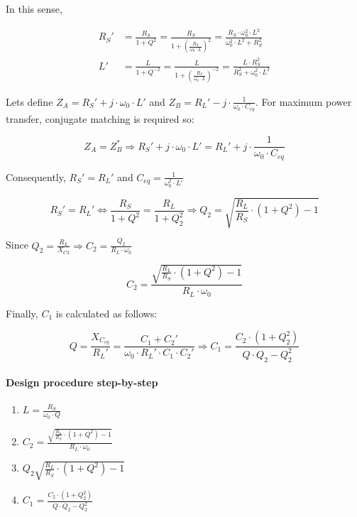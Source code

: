 \noindent In this sense,

\begin{align}
  R_S' &= \frac{R_S}{1 + Q^2} = \frac{R_S}{1 + \left( \frac{R_S}{\omega_0 \cdot L} \right)^2} = \frac{R_S \cdot \omega_0^2 \cdot L^2}{\omega_0^2 \cdot L^2 + R_S^2}\\
  L' &= \frac{L}{1 + Q^{-2}} = \frac{L}{1 + \left( \frac{R_S}{\omega_0 \cdot L}\right)^{-2}} = \frac{L \cdot R_S^2}{R_S^2 + \omega_0^2 \cdot L^2}
\end{align}

\noindent Lets define $Z_A = R_S' + j \cdot \omega_0 \cdot L'$ and $Z_B = R_L' - j \cdot \frac{1}{\omega_0 \cdot C_{eq}}$. For maximum power transfer, conjugate matching is required so:

\begin{equation}
Z_A = Z_B^* \Longrightarrow R_S' + j \cdot \omega_0 \cdot L' = R_L' + j \cdot \frac{1}{\omega_0 \cdot C_{eq}}
\end{equation}

\noindent Consequently, $R_S' = R_L'$ and $C_{eq} = \frac{1}{\omega_0^2 \cdot L'}$

\begin{equation}
R_S' = R_L' \Longleftrightarrow \frac{R_S}{1 + Q^2} = \frac{R_L}{1 + Q_2^2} \Longrightarrow Q_2 = \sqrt{\frac{R_L}{R_S} \cdot (1 + Q^2) - 1}
\end{equation}


\noindent Since $Q_2 = \frac{R_L}{X_{C2}} \Longrightarrow C_2 = \frac{Q_2}{R_L \cdot \omega_0}$

\begin{equation}
C_2 = \frac{\sqrt{\frac{R_L}{R_S} \cdot (1 + Q^2)  - 1 }}{R_L \cdot \omega_0}
\end{equation}

\noindent Finally, $C_1$ is calculated as follows:

\begin{equation}
Q = \frac{X_{C_{eq}}}{R_L'} = \frac{C_1 + C_2'}{\omega_0 \cdot R_L' \cdot C_1 \cdot C_2'} \Longrightarrow C_1 = \frac{C_2 \cdot (1 + Q_2^2)}{Q \cdot Q_2 - Q_2^2}
\end{equation}

\paragraph{Design procedure step-by-step}

\begin{enumerate}
  \item $L = \frac{R_S}{\omega_0 \cdot Q}$
  \item $C_2 = \frac{\sqrt{\frac{R_L}{R_S} \cdot (1 + Q^2) - 1 }}{R_L \cdot \omega_0}$
  \item $Q_2 \sqrt{\frac{R_L}{R_S} \cdot (1 + Q^2) - 1}$
  \item $C_1 = \frac{C_2 \cdot (1 + Q_2^2)}{Q \cdot Q_2 - Q_2^2}$
\end{enumerate}


